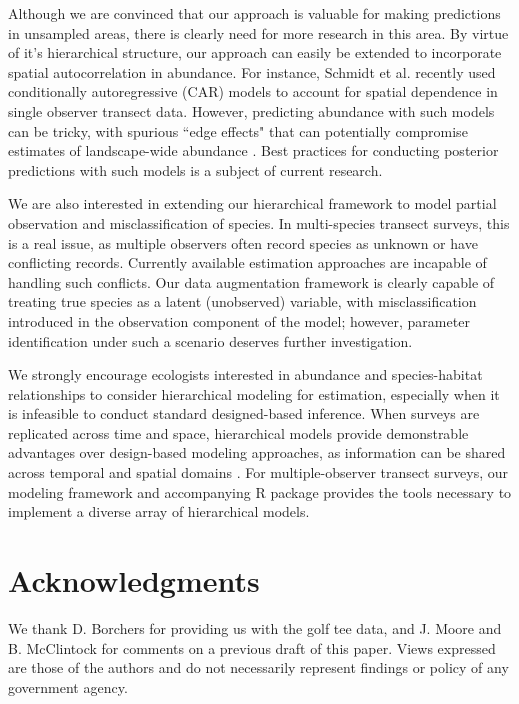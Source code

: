 \documentclass[10pt]{article}
\begin{document}
Although we are convinced that our approach is valuable for making predictions in unsampled areas, there is clearly need for more research in this area.  By virtue of it's hierarchical structure, our approach can easily be extended to incorporate spatial autocorrelation in abundance.  For instance, Schmidt et al. \cite{SchmidtEtAl2012} recently used conditionally autoregressive (CAR) models to account for spatial dependence in single observer transect data.  However, predicting abundance with such models can be tricky, with spurious ``edge effects" that can potentially compromise estimates of landscape-wide abundance \cite{VerHoefJansen2007}.  Best practices for conducting posterior predictions with such models is a subject of current research.

We are also interested in extending our hierarchical framework to model partial observation and misclassification of species.  In multi-species transect surveys, this is a real issue, as multiple observers often record species as unknown or have conflicting records.  Currently available estimation approaches are incapable of handling such conflicts.  Our data augmentation framework is clearly capable of treating true species as a latent (unobserved) variable, with misclassification introduced in the observation component of the model; however, parameter identification under such a scenario deserves further investigation.

We strongly encourage ecologists interested in abundance and species-habitat relationships to consider hierarchical modeling for estimation, especially when it is infeasible to conduct standard designed-based inference.  When surveys are replicated across time and space, hierarchical models provide demonstrable advantages over design-based modeling approaches, as information can be shared across temporal and spatial domains \cite{RoyleEtAl2007,MooreBarlow2011}.  For multiple-observer transect surveys, our modeling framework and accompanying R package provides the tools necessary to implement a diverse array of hierarchical models.

\section*{Acknowledgments}
We thank D. Borchers for providing us with the golf tee data, and J. Moore and B. McClintock for comments on a previous draft of this paper.  Views expressed are those of the authors and do not necessarily represent findings or policy of any government agency.
\end{document}
